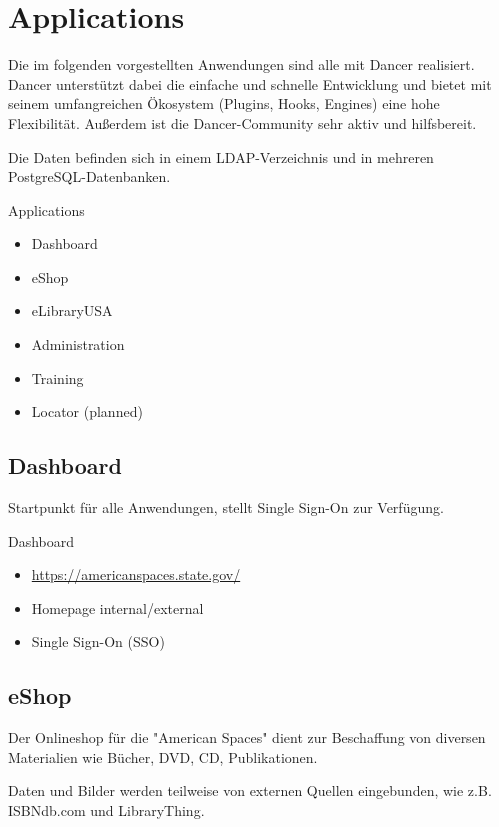 \section{Applications}
    
Die im folgenden vorgestellten Anwendungen sind alle mit Dancer realisiert.
Dancer unterstützt dabei die einfache und schnelle Entwicklung und bietet mit
seinem umfangreichen Ökosystem (Plugins, Hooks, Engines) eine hohe
Flexibilität. Außerdem ist die Dancer-Community sehr aktiv und
hilfsbereit.

Die Daten befinden sich in einem LDAP-Verzeichnis und in
mehreren PostgreSQL-Datenbanken.

\begin{frame}{Applications}
\begin{itemize}
\item Dashboard
\item eShop
\item eLibraryUSA
\item Administration
\item Training
\item Locator (planned) 
\end{itemize}
\end{frame}

\subsection{Dashboard}
Startpunkt für alle Anwendungen, stellt Single Sign-On zur Verfügung.

\begin{frame}{Dashboard}
\begin{itemize}
\item \url{https://americanspaces.state.gov/}
\item Homepage internal/external
\item Single Sign-On (SSO)
\end{itemize}
\end{frame}
    
\subsection{eShop}

Der Onlineshop für die "American Spaces" dient zur Beschaffung von
diversen Materialien wie Bücher, DVD, CD, Publikationen.

Daten und Bilder werden teilweise von externen Quellen eingebunden,
wie z.B. ISBNdb.com und LibraryThing.

